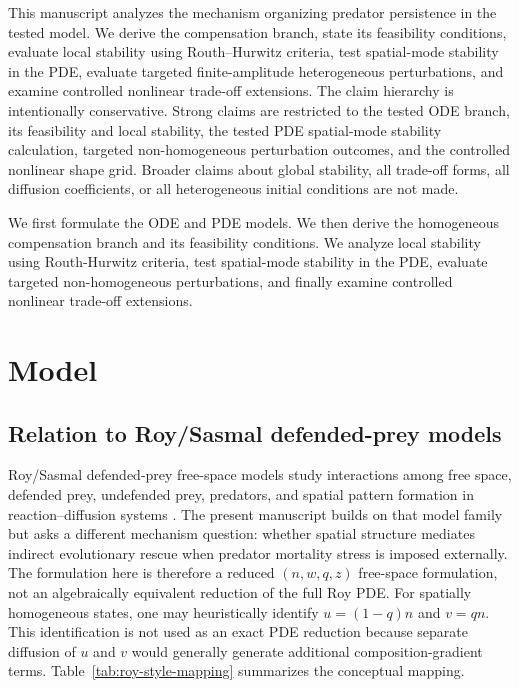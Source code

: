 \documentclass[11pt]{article}
\begin{document}
This manuscript analyzes the mechanism organizing predator persistence in the tested model. We derive the compensation branch, state its feasibility conditions, evaluate local stability using Routh--Hurwitz criteria, test spatial-mode stability in the PDE, evaluate targeted finite-amplitude heterogeneous perturbations, and examine controlled nonlinear trade-off extensions. The claim hierarchy is intentionally conservative. Strong claims are restricted to the tested ODE branch, its feasibility and local stability, the tested PDE spatial-mode stability calculation, targeted non-homogeneous perturbation outcomes, and the controlled nonlinear shape grid. Broader claims about global stability, all trade-off forms, all diffusion coefficients, or all heterogeneous initial conditions are not made.

We first formulate the ODE and PDE models. We then derive the homogeneous compensation branch and its feasibility conditions. We analyze local stability using Routh-Hurwitz criteria, test spatial-mode stability in the PDE, evaluate targeted non-homogeneous perturbations, and finally examine controlled nonlinear trade-off extensions.

\section{Model}

\subsection*{Relation to Roy/Sasmal defended-prey models}

Roy/Sasmal defended-prey free-space models study interactions among free space, defended prey, undefended prey, predators, and spatial pattern formation in reaction--diffusion systems \citep{SasmalBanerjeeTakeuchi2019,RoyEtAl2026}. The present manuscript builds on that model family but asks a different mechanism question: whether spatial structure mediates indirect evolutionary rescue when predator mortality stress is imposed externally. The formulation here is therefore a reduced \((n,w,q,z)\) free-space formulation, not an algebraically equivalent reduction of the full Roy PDE. For spatially homogeneous states, one may heuristically identify \(u=(1-q)n\) and \(v=qn\). This identification is not used as an exact PDE reduction because separate diffusion of \(u\) and \(v\) would generally generate additional composition-gradient terms. Table~\ref{tab:roy-style-mapping} summarizes the conceptual mapping.
\end{document}
